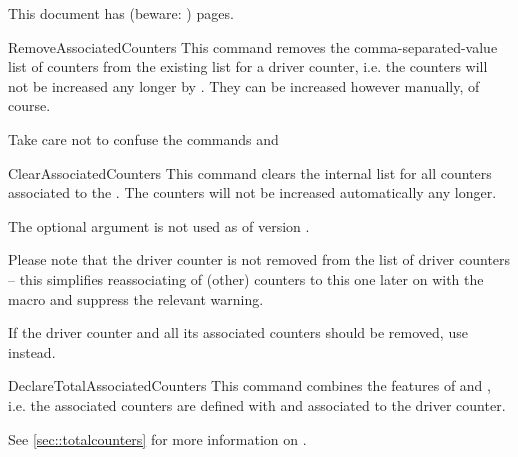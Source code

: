 \documentclass[12pt,a4paper,oneside]{article}
\makeatletter
\newcommand{\chdocextractversion}[1]{%
  \@nameuse{#1}%
}
\newcommand{\CHDocNew}[1]{%
  \tcbdocmarginnote[doclang/new={N},
  colframe=blue,
  halign=left,
  colback={blue!20!white},
  fontupper={\tiny}
  ]{%
    \chdocextractversion{xassoccntversion#1}%
  }%
}
\def\packageversion{\xassoccntpackageversion}%
\makeatother
\begin{document}
\begin{dispExample}
This document has \number{} (beware: \number{}) pages.
\end{dispExample}



\begin{docCommand}{RemoveAssociatedCounters}{}
This command removes the comma-separated-value list of counters from the existing list for a driver counter, i.e. the counters will not be increased any longer by . They can be increased however manually, of course. 

Take care not to confuse the commands 
and{}\linebreak {}
\end{docCommand}

\begin{docCommand}{ClearAssociatedCounters}{}
This command clears the internal list for all counters associated to the . The counters will not be increased automatically any longer.

The optional argument is not used as of version \packageversion.

Please note that the driver counter is not removed from the list of driver counters -- this simplifies reassociating of (other) counters to this one later on with the macro  and suppress the relevant warning.

If the driver counter and all its associated counters should be removed, use  instead. 
\end{docCommand}


\begin{docCommand}[before={\CHDocNew{1.2}}]{DeclareTotalAssociatedCounters}{}
This command combines the features of  and , i.e. the associated counters are defined with  and associated to the driver counter.

See \cref{sec::totalcounters} for more information on . 
\end{docCommand}
\end{document}
